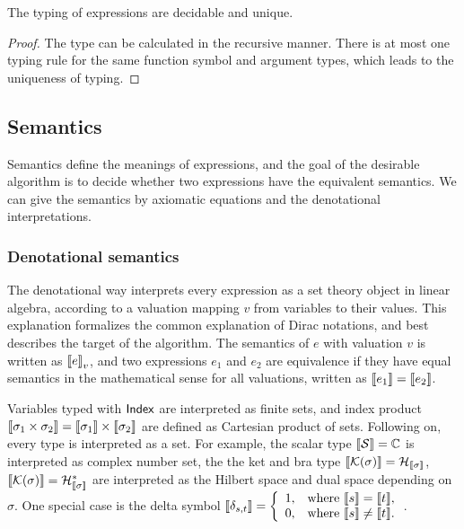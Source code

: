 \documentclass[runningheads]{llncs}
\begin{document}
\begin{lemma}
    The typing of expressions are decidable and unique.
\end{lemma}

\begin{proof}
    The type can be calculated in the recursive manner. There is at most one typing rule for the same function symbol and argument types, which leads to the uniqueness of typing.
\end{proof}

\subsection{Semantics}

Semantics define the meanings of expressions, and the goal of the desirable algorithm is to decide whether
two expressions have the equivalent semantics. We can give the semantics by axiomatic equations and the denotational interpretations.

\subsubsection{Denotational semantics} The denotational way interprets every expression as a set theory object in linear algebra, according to a valuation mapping $v$ from variables to their values. This explanation formalizes the common explanation of Dirac notations, and best describes the target of the algorithm.
The semantics of $e$ with valuation $v$ is written as ${\llbracket e \rrbracket}_v$, and two expressions $e_1$ and $e_2$ are equivalence if they have equal semantics in the mathematical sense for all valuations, written as ${\llbracket e_1 \rrbracket} = {\llbracket e_2 \rrbracket}$.

Variables typed with $\mathsf{Index}$ are interpreted as finite sets, and index product ${\llbracket \sigma_1 \times \sigma_2 \rrbracket} = {\llbracket \sigma_1 \rrbracket} \times {\llbracket \sigma_2 \rrbracket}$ are defined as Cartesian product of sets. Following on, every type is interpreted as a set. For example, the scalar type ${\llbracket \mathcal{S} \rrbracket} = \mathbb{C}$ is interpreted as complex number set, the the ket and bra type ${\llbracket \mathcal{K}(\sigma) \rrbracket} = \mathcal{H}_{{\llbracket \sigma \rrbracket}}$, ${\llbracket \mathcal{K}(\sigma) \rrbracket} = \mathcal{H}_{{\llbracket \sigma \rrbracket}}^*$ are interpreted as the Hilbert space and dual space depending on $\sigma$. One special case is the delta symbol 
${\llbracket \delta_{s, t} \rrbracket} = 
\left \{  
    \begin{array}{ll}
        1, & \text{where } {\llbracket s \rrbracket} = {\llbracket t \rrbracket}, \\
        0, & \text{where } {\llbracket s \rrbracket} \neq {\llbracket t \rrbracket}.
    \end{array} 
\right .
$.
\end{document}
